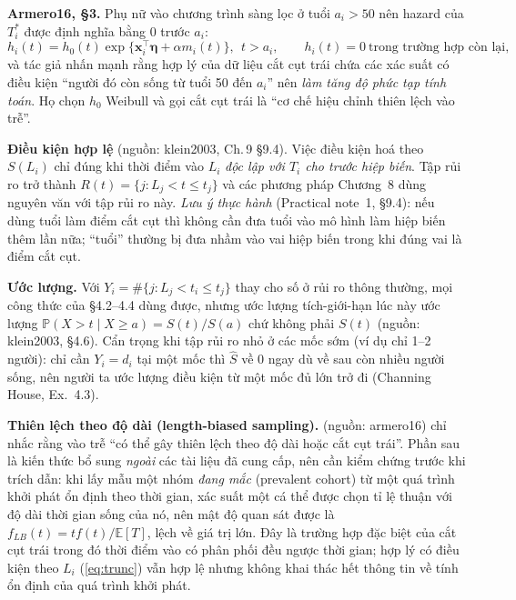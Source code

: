\documentclass[11pt,a4paper,notitlepage]{report}
\newcommand{\Prob}{\mathbb{P}}
\newcommand{\E}{\mathbb{E}}
\newcommand{\tr}{^{\top}}
\providecommand{\nguon}[1]{(nguồn: #1)}
\begin{document}
\begin{bosung}
\textbf{Armero16, \S3.} Phụ nữ vào chương trình sàng lọc ở tuổi $a_i>50$ nên hazard của $T_i^{*}$ được định nghĩa bằng $0$ trước $a_i$:
\[
h_i(t)=h_0(t)\exp\{\bm x_i\tr\bm\eta+\alpha m_i(t)\},\ \ t>a_i,\qquad h_i(t)=0\ \text{trong trường hợp còn lại,}
\]
và tác giả nhấn mạnh rằng hợp lý của dữ liệu cắt cụt trái chứa các xác suất có điều kiện ``người đó còn sống từ tuổi 50 đến $a_i$''
nên \emph{làm tăng độ phức tạp tính toán}. Họ chọn $h_0$ Weibull và gọi cắt cụt trái là ``cơ chế hiệu chỉnh thiên lệch vào trễ''.

\textbf{Điều kiện hợp lệ} \nguon{klein2003, Ch.\,9 \S9.4}. Việc điều kiện hoá theo $S(L_i)$ chỉ đúng khi thời điểm vào $L_i$ \emph{độc lập với $T_i$ cho trước hiệp biến}.
Tập rủi ro trở thành $R(t)=\{j: L_j<t\le t_j\}$ và các phương pháp Chương~8 dùng nguyên văn với tập rủi ro này.
\emph{Lưu ý thực hành} (Practical note~1, \S9.4): nếu dùng tuổi làm điểm cắt cụt thì không cần đưa tuổi vào mô hình làm hiệp biến thêm lần nữa; ``tuổi'' thường bị đưa nhầm vào vai hiệp biến trong khi đúng vai là điểm cắt cụt.

\textbf{Ước lượng.} Với $Y_i=\#\{j:L_j<t_i\le t_j\}$ thay cho số ở rủi ro thông thường, mọi công thức của \S4.2--4.4 dùng được, nhưng
ước lượng tích-giới-hạn lúc này ước lượng $\Prob(X>t\mid X\ge a)=S(t)/S(a)$ chứ không phải $S(t)$ \nguon{klein2003, \S4.6}.
Cẩn trọng khi tập rủi ro nhỏ ở các mốc sớm (ví dụ chỉ 1--2 người): chỉ cần $Y_i=d_i$ tại một mốc thì $\hat S$ về 0 ngay dù về sau còn nhiều người sống, nên người ta ước lượng điều kiện từ một mốc đủ lớn trở đi (Channing House, Ex.~4.3).

\textbf{Thiên lệch theo độ dài (length-biased sampling).} \nguon{armero16} chỉ nhắc rằng vào trễ ``có thể gây thiên lệch theo độ dài hoặc cắt cụt trái''.
Phần sau là kiến thức bổ sung \emph{ngoài} các tài liệu đã cung cấp, nên cần kiểm chứng trước khi trích dẫn: khi lấy mẫu một nhóm \emph{đang mắc} (prevalent cohort) từ một quá trình khởi phát ổn định theo thời gian,
xác suất một cá thể được chọn tỉ lệ thuận với độ dài thời gian sống của nó, nên mật độ quan sát được là $f_{LB}(t)=t f(t)/\E[T]$, lệch về giá trị lớn.
Đây là trường hợp đặc biệt của cắt cụt trái trong đó thời điểm vào có phân phối đều ngược thời gian; hợp lý có điều kiện theo $L_i$ (\eqref{eq:trunc}) vẫn hợp lệ nhưng không khai thác hết thông tin về tính ổn định của quá trình khởi phát.
\end{bosung}
\end{document}
